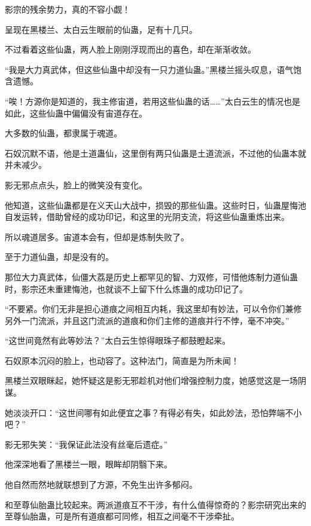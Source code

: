 
\begin{this_body}

影宗的残余势力，真的不容小觑！

呈现在黑楼兰、太白云生眼前的仙蛊，足有十几只。

不过看着这些仙蛊，两人脸上刚刚浮现而出的喜色，却在渐渐收敛。

“我是大力真武体，但这些仙蛊中却没有一只力道仙蛊。”黑楼兰摇头叹息，语气饱含遗憾。

“唉！方源你是知道的，我主修宙道，若用这些仙蛊的话……”太白云生的情况也是如此，这些仙蛊中偏偏没有宙道存在。

大多数的仙蛊，都隶属于魂道。

石奴沉默不语，他是土道蛊仙，这里倒有两只仙蛊是土道流派，不过他的仙蛊本就并未减少。

影无邪点点头，脸上的微笑没有变化。

他知道，这些仙蛊都是在义天山大战中，损毁的那些仙蛊。这些时日，仙蛊屋悔池自发运转，借助曾经的成功印记，和这里的光阴支流，将这些仙蛊重炼出来。

所以魂道居多。宙道本会有，但却是炼制失败了。

至于力道仙蛊，却是没有的。

那位大力真武体，仙僵大荔是历史上都罕见的智、力双修，可惜他炼制力道仙蛊时，影宗还未重建悔池，也就谈不上留下什么炼蛊的成功印记了。

“不要紧。你们无非是担心道痕之间相互内耗，我这里却有妙法，可以令你们兼修另外一门流派，并且这门流派的道痕和你们主修的道痕并行不悖，毫不冲突。”

“这世间竟然有此等妙法？”太白云生惊得眼珠子都鼓瞪起来。

石奴原本沉闷的脸上，也动容了。这种法门，简直是为所未闻！

黑楼兰双眼眯起，她怀疑这是影无邪趁机对他们增强控制力度，她感觉这是一场阴谋。

她淡淡开口：“这世间哪有如此便宜之事？有得必有失，如此妙法，恐怕弊端不小吧？”

影无邪失笑：“我保证此法没有丝毫后遗症。”

他深深地看了黑楼兰一眼，眼眸却阴翳下来。

他自然而然地就联想到了方源，不免生出许多郁闷。

和至尊仙胎蛊比较起来。两派道痕互不干涉，有什么值得惊奇的？影宗研究出来的至尊仙胎蛊，可是所有道痕都可同修，相互之间毫不干涉牵扯。


\end{this_body}
